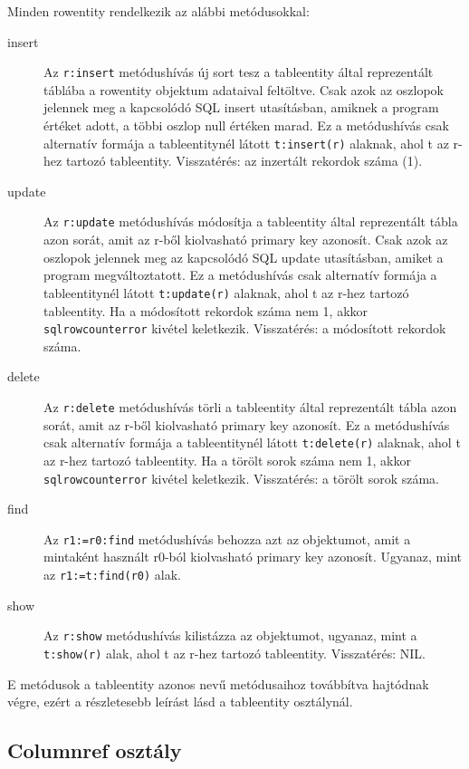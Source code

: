 Minden rowentity rendelkezik az alábbi metódusokkal: 
\begin{description}
\item[insert]
    Az \verb!r:insert! metódushívás új sort tesz a tableentity
    által reprezentált táblába a rowentity objektum adataival feltöltve.
    Csak azok az oszlopok jelennek meg a kapcsolódó SQL insert utasításban, 
    amiknek a program értéket adott, a többi oszlop null értéken marad.
    Ez a metódushívás csak alternatív formája a tableentitynél látott
    \verb!t:insert(r)! alaknak, ahol t az r-hez tartozó tableentity.
    Visszatérés: az inzertált rekordok száma (1).
\item[update]
    Az \verb!r:update! metódushívás módosítja a tableentity
    által reprezentált tábla azon sorát, amit az r-ből kiolvasható
    primary key azonosít. Csak azok az oszlopok jelennek meg az kapcsolódó
    SQL update utasításban, amiket a program megváltoztatott.
    Ez a metódushívás csak alternatív formája a tableentitynél látott
    \verb!t:update(r)! alaknak, ahol t az r-hez tartozó tableentity.
    Ha a módosított rekordok száma nem 1, akkor \verb!sqlrowcounterror! kivétel 
    keletkezik. Visszatérés: a módosított rekordok száma.
\item[delete]
    Az \verb!r:delete! metódushívás törli a tableentity
    által reprezentált tábla azon sorát, amit az r-ből kiolvasható
    primary key azonosít.
    Ez a metódushívás csak alternatív formája a tableentitynél látott
    \verb!t:delete(r)! alaknak, ahol t az r-hez tartozó tableentity.
    Ha a törölt sorok száma nem 1, akkor \verb!sqlrowcounterror! kivétel 
    keletkezik. Visszatérés: a törölt sorok száma.
\item[find]
    Az \verb!r1:=r0:find! metódushívás behozza azt az objektumot,
    amit a mintaként használt r0-ból kiolvasható primary key
    azonosít. Ugyanaz, mint az \verb!r1:=t:find(r0)! alak.
\item[show]
    Az \verb!r:show! metódushívás kilistázza az objektumot, ugyanaz, 
    mint a \verb!t:show(r)! alak, ahol t az r-hez tartozó tableentity.
    Visszatérés: NIL.
\end{description}

E metódusok a tableentity azonos nevű metódusaihoz továbbítva
hajtódnak végre, ezért a részletesebb leírást lásd a tableentity
osztálynál.


\subsection{Columnref osztály}

